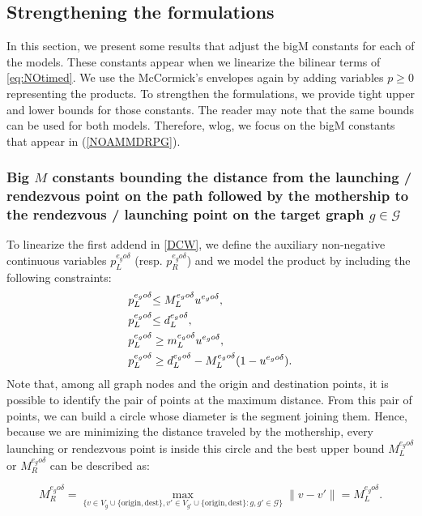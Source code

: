 \documentclass[10pt,a4paper]{elsarticle}
\newcommand{\CV}[1]{{\color{black}#1}}
\newcommand{\RE}[1]{{\color{black}#1}}
\newcommand{\EN}[1]{{\color{black}#1}}
\begin{document}
			\subsection*{Strengthening the formulations}
			\noindent
			In this section\RE{,} we present some results that adjust the bigM constants for each of the models. These constants appear when we linearize the bilinear terms of \eqref{eq:NOtimed}. We use the McCormick's envelopes \EN{again} by adding variables $p\geq 0$  representing the products. \CV{To} strengthen the formulations\RE{,} we provide tight upper and lower bounds for those constants. The reader may note that the same bounds can be used for both models. Therefore, wlog, we focus on the bigM constants that appear in (\ref{NOAMMDRPG}).
			
						
			
			
			\subsubsection*{Big $M$ constants bounding the distance from the launching / rendezvous point on the path followed by the mothership to the rendezvous / launching point on the target graph $g\in \mathcal{G}$}
			
			
				\noindent
				\RE{To linearize the first addend in \eqref{DCW}}, we define the auxiliar\CV{y} non-negative continuous variables $p_L^{e_go\delta}$ (resp. $p_R^{e_go\delta}$) and we model the product by including the following constraints:
				\begin{align*}
					\RE{p_L^{e_go\delta}} & \RE{\leq  M_L^{e_go\delta}u^{e_go\delta},}\\
					\RE{p_L^{e_go\delta}} & \RE{\leq d_L^{e_go\delta},} \\
					p_L^{e_go\delta} & \geq m_L^{e_go\delta} u^{e_go\delta}, \\
					p_L^{e_go\delta} & \geq d_L^{e_go\delta} - M_L^{e_go\delta}(1-u^{e_go\delta}).
				\end{align*}
				\RE{Note that, among all graph nodes and the origin and destination points, it is possible to identify the pair of points at the maximum distance. From this pair of points, we can build a circle whose diameter is the segment joining them. Hence, because we are minimizing the distance traveled by the mothership, every launching  or rendezvous point is inside this circle and the best upper bound $M_L^{e_go\delta}$ or $M_R^{e_go\delta}$ can be described as:}
				
				$$
				M_R^{e_go\delta} = \max_{\{v\in V_g\cup\{\text{origin}, \text{dest}\}, v'\in V_{g'}\cup\{\text{origin}, \text{dest}\} : g, g'\in\mathcal G\}} \|v - v'\| = M_L^{e_go\delta}.
				$$
				
\end{document}
